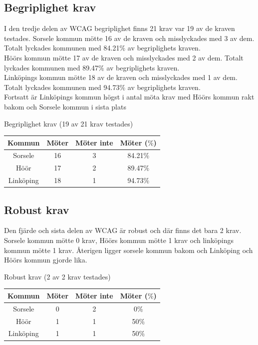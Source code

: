 \documentclass[11p]{article}
\begin{document}
    \subsection{Begriplighet krav}
    I den tredje delen av WCAG begriplighet finns 21 krav var 19 av de kraven testades.
    Sorsele kommun mötte 16 av de kraven och misslyckades med 3 av dem.
    Totalt lyckades kommunen med 84.21$\%$ av begriplighets kraven.
    \\Höörs kommun mötte 17 av de kraven och misslyckades med 2 av dem.
    Totalt lyckades kommunen med 89.47$\%$ av begriplighets kraven.
    \\Linköpings kommun mötte 18 av de kraven och misslyckades med 1 av dem.
    Totalt lyckades kommunen med 94.73$\%$ av begriplighets kraven.
    \\Fortsatt är Linköpings kommun högst i antal möta krav med Höörs kommun rakt bakom och Sorsele kommun i sista plats

    \begin{center}
    Begriplighet krav (19 av 21 krav testades)

    \begin{tabular}{ |c|c|c|c|}
        \hline
        Kommun & Möter & Möter inte & Möter ($\%$) \\  \hline
        Sorsele & 16 & 3 & 84.21$\%$ \\ \hline
        Höör & 17 & 2 & 89.47$\%$ \\ \hline
        Linköping & 18 & 1 & 94.73$\%$ \\ \hline
    \end{tabular}
    \end{center}

    \subsection{Robust krav}
    Den fjärde och sista delen av WCAG är robust och där finns det bara 2 krav.
    Sorsele kommun mötte 0 krav, Höörs kommun mötte 1 krav och linköpings kommun mötte 1 krav.
    Återigen ligger sorsele kommun bakom och Linköping och Höörs kommun gjorde lika.

    \begin{center}
    Robust krav (2 av 2 krav testades)

    \begin{tabular}{ |c|c|c|c|}
        \hline
        Kommun & Möter & Möter inte & Möter ($\%$) \\  \hline
        Sorsele & 0 & 2 & 0$\%$ \\ \hline
        Höör & 1 & 1 & 50$\%$ \\ \hline
        Linköping & 1 & 1 & 50$\%$ \\ \hline
    \end{tabular}
    \end{center}
    
\end{document}
